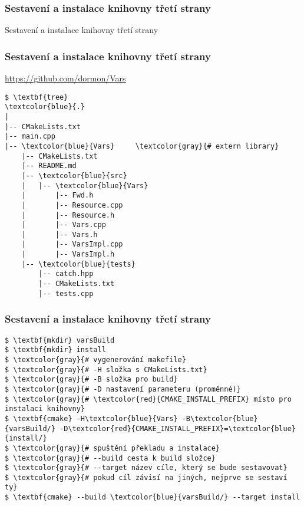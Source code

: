 \begin{frame}
\frametitle{Sestavení a instalace knihovny třetí strany}
\begin{center}
\Huge {\color{white}Sestavení a instalace knihovny třetí strany}
\end{center}
\end{frame}

\begin{frame}[fragile]
\frametitle{Sestavení a instalace knihovny třetí strany}
\url{https://github.com/dormon/Vars}
{\scriptsize
\begin{Verbatim}[commandchars=\\\{\}]
$ \textbf{tree}
\textcolor{blue}{.}
|
|-- CMakeLists.txt
|-- main.cpp
|-- \textcolor{blue}{Vars}     \textcolor{gray}{# extern library}
    |-- CMakeLists.txt
    |-- README.md
    |-- \textcolor{blue}{src}
    |   |-- \textcolor{blue}{Vars}
    |       |-- Fwd.h
    |       |-- Resource.cpp
    |       |-- Resource.h
    |       |-- Vars.cpp
    |       |-- Vars.h
    |       |-- VarsImpl.cpp
    |       |-- VarsImpl.h
    |-- \textcolor{blue}{tests}
        |-- catch.hpp
        |-- CMakeLists.txt
        |-- tests.cpp
\end{Verbatim}
}
\end{frame}

\begin{frame}[fragile]
\frametitle{Sestavení a instalace knihovny třetí strany}
{\small
\begin{Verbatim}[commandchars=\\\{\}]
$ \textbf{mkdir} varsBuild
$ \textbf{mkdir} install
$ \textcolor{gray}{# vygenerování makefile}
$ \textcolor{gray}{# -H složka s CMakeLists.txt}
$ \textcolor{gray}{# -B složka pro build}
$ \textcolor{gray}{# -D nastavení parameteru (proměnné)}
$ \textcolor{gray}{# \textcolor{red}{CMAKE_INSTALL_PREFIX} místo pro instalaci knihovny}
$ \textbf{cmake} -H\textcolor{blue}{Vars} -B\textcolor{blue}{varsBuild/} -D\textcolor{red}{CMAKE_INSTALL_PREFIX}=\textcolor{blue}{install/}
$ \textcolor{gray}{# spuštění překladu a instalace}
$ \textcolor{gray}{# --build cesta k build složce}
$ \textcolor{gray}{# --target název cíle, který se bude sestavovat}
$ \textcolor{gray}{# pokud cíl závisí na jiných, nejprve se sestaví ty}
$ \textbf{cmake} --build \textcolor{blue}{varsBuild/} --target install
\end{Verbatim}
}  
\end{frame}

